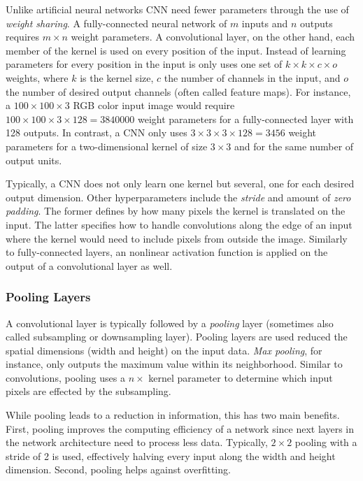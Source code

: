 Unlike artificial neural networks CNN need fewer parameters through the use of \emph{weight sharing}. A fully-connected neural network of $m$ inputs and $n$ outputs requires $m \times n$ weight parameters. A convolutional layer, on the other hand, each member of the kernel is used on every position of the input. Instead of learning parameters for every position in the input is only uses one set of $k \times k \times c \times o$ weights, where $k$ is the kernel size, $c$ the number of channels in the input, and $o$ the number of desired output channels (often called feature maps). For instance, a $100 \times 100 \times 3$ RGB color input image would require $100 \times 100 \times 3 \times 128 = 3840000$ weight parameters for a fully-connected layer with \num{128} outputs. In contrast, a CNN only uses $3 \times 3 \times 3 \times 128 = 3456$ weight parameters for a two-dimensional kernel of size $3 \times 3$ and for the same number of output units.

Typically, a CNN does not only learn one kernel but several, one for each desired output dimension. Other hyperparameters include the \emph{stride} and amount of \emph{zero padding}. The former defines by how many pixels the kernel is translated on the input. The latter specifies how to handle convolutions along the edge of an input where the kernel would need to include pixels from outside the image. Similarly to fully-connected layers, an nonlinear activation function is applied on the output of a convolutional layer as well.  

\subsubsection{Pooling Layers}
A convolutional layer is typically followed by a \emph{pooling} layer (sometimes also called subsampling or downsampling layer). Pooling layers are used reduced the spatial dimensions (width and height) on the input data. \emph{Max pooling}, for instance, only outputs the maximum value within its neighborhood. Similar to convolutions, pooling uses a $n \times $ kernel parameter to determine which input pixels are effected by the subsampling.

	While pooling leads to a reduction in information, this has two main benefits. First, pooling improves the computing efficiency of a network since next layers in the network architecture need to process less data. Typically, $2 \times 2$ pooling with a stride of \num{2} is used, effectively halving every input along the width and height dimension. 	
	Second, pooling helps against overfitting.
	
